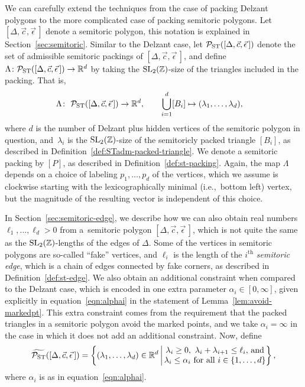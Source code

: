 \documentclass[pdftex]{sigma}
\numberwithin{equation}{section}
\def\R{{\mathbb R}}
\def\Z{{\mathbb Z}}
\newcommand{\De}{\Delta}
\newcommand{\PST}{\mathcal{P}_{\rm ST}}
\newcommand{\PSTtilde}{\widetilde{\mathcal{P}_{\rm ST}}}
\newcommand{\SL}{{\rm SL}_2(\Z)}
\newcommand{\stpoly}{[\De,\vec{c},\vec{\epsilon}\,]}
\begin{document}
We can carefully extend the techniques from the case of packing Delzant polygons to the more complicated case of packing semitoric polygons.
Let $\stpoly$ denote a semitoric polygon, this notation is explained in Section~\ref{sec:semitoric}.
Similar to the Delzant case, let $\PST(\stpoly)$ denote the set of admissible semitoric packings of $\stpoly$, and define $\Lambda \colon \PST(\stpoly)\to\R^d$ by taking the $\SL$-size of the triangles included in the packing. That is,
\begin{align}\label{eqn:LambdaST} \Lambda \colon\ \PST(\stpoly)   \to \R^d, \qquad \bigcup_{i=1}^d [B_i] & \mapsto (\lambda_1,\ldots, \lambda_d),
\end{align}
where $d$ is the number of Delzant plus hidden vertices of the semitoric polygon in question, and~$\lambda_i$ is the $\SL$-size of the semitoricly packed triangle $[B_i]$, as described in Definition~\ref{def:STadm-packed-triangle}. We denote a semitoric packing by $[P]$, as described in Definition~\ref{def:st-packing}.
Again, the map $\Lambda$ depends on a choice of labeling $p_1,\ldots,p_d$ of the vertices, which we assume is clockwise starting with the lexicographically minimal (i.e.,~bottom left) vertex, but the magnitude of the resulting vector is independent of this choice.

In Section~\ref{sec:semitoric-edge},
 we describe how we can also obtain real numbers $\ell_1,\ldots, \ell_d>0$ from a~semitoric polygon $\stpoly$, which is not quite the same as the $\SL$-lengths of the edges of $\De$.
Some of the vertices in semitoric polygons are so-called ``fake'' vertices, and $\ell_i$ is the length of the $i^\mathrm{th}$ \emph{semitoric edge}, which is a chain of edges connected by fake corners, as described in Definition~\ref{def:st-edge}.
We also obtain an additional constraint when compared to the Delzant case, which is encoded in one extra parameter $\alpha_i\in [0,\infty]$, given explicitly in equation~\eqref{eqn:alphai} in the statement of Lemma~\ref{lem:avoid-markedpt}. This extra constraint comes from the requirement that the packed triangles in a semitoric polygon avoid the marked points, and we take $\alpha_i=\infty$ in the case in which it does not add an additional constraint. Now, define
\begin{equation}\label{eqn:PSTtilde}
 \PSTtilde(\stpoly) = \left\{(\lambda_1,\ldots,\lambda_d)\in\R^d \,\bigg|\, \begin{matrix}\lambda_i\geq 0,\  \lambda_i+\lambda_{i+1}\leq \ell_i \text{, and}\\  \lambda_i\leq \alpha_i\text{ for all }i\in\{1,\ldots,d\}\end{matrix}\right\},
\end{equation}
where $\alpha_i$ is as in equation~\eqref{eqn:alphai}.
\end{document}
